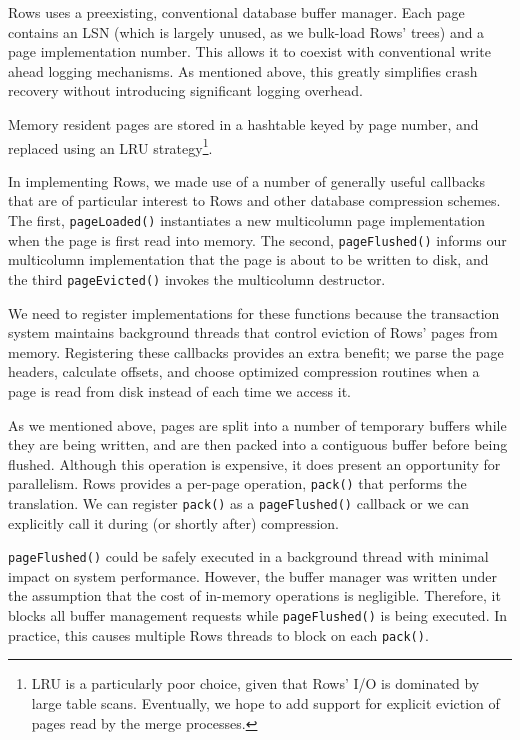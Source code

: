\documentclass{sig-alternate-sigmod08}
\newcommand{\rows}{Rows\xspace}
\newcommand{\rowss}{Rows'\xspace}
\begin{document}
\rows uses a preexisting, conventional database buffer manager.  Each
page contains an LSN (which is largely unused, as we bulk-load \rowss
trees) and a page implementation number.  This allows it to coexist
with conventional write ahead logging mechanisms.  As mentioned above,
this greatly simplifies crash recovery without introducing significant
logging overhead.

Memory resident pages are stored in a
hashtable keyed by page number, and replaced using an LRU
strategy\footnote{LRU is a particularly poor choice, given that \rowss
  I/O is dominated by large table scans.  Eventually, we hope to add
  support for explicit eviction of pages read by the merge processes.}.

In implementing \rows, we made use of a number of generally useful
callbacks that are of particular interest to \rows and other database
compression schemes.  The first, {\tt pageLoaded()} instantiates a new
multicolumn page implementation when the page is first read into
memory.  The second, {\tt pageFlushed()} informs our multicolumn
implementation that the page is about to be written to disk, and the
third {\tt pageEvicted()} invokes the multicolumn destructor.

We need to register implementations for these functions because the
transaction system maintains background threads that control eviction of \rowss
pages from memory.  Registering these callbacks provides an extra
benefit; we parse the page headers, calculate offsets,
and choose optimized compression routines when a page is read from
disk instead of each time we access it.

As we mentioned above, pages are split into a number of temporary
buffers while they are being written, and are then packed into a
contiguous buffer before being flushed.  Although this operation is
expensive, it does present an opportunity for parallelism.  \rows
provides a per-page operation, {\tt pack()} that performs the
translation.  We can register {\tt pack()} as a {\tt pageFlushed()}
callback or we can explicitly call it during (or shortly after)
compression.

{\tt pageFlushed()} could be safely executed in a background thread
with minimal impact on system performance.  However, the buffer
manager was written under the assumption that the cost of in-memory
operations is negligible.  Therefore, it blocks all buffer management
requests while {\tt pageFlushed()} is being executed.  In practice,
this causes multiple \rows threads to block on each {\tt pack()}.
\end{document}
